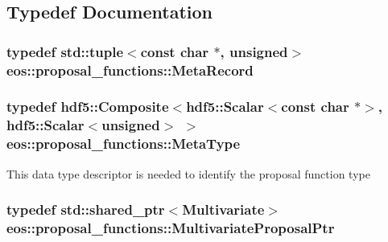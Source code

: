 \subsection{Typedef Documentation}
\hypertarget{namespaceeos_1_1proposal__functions_a7b9711fcd1f76e034c72073e2d5d7f15}{
\subsubsection[{MetaRecord}]{\setlength{\rightskip}{0pt plus 5cm}typedef std::tuple$<$const char $\ast$, unsigned$>$ {\bf eos::proposal\_\-functions::MetaRecord}}}
\label{namespaceeos_1_1proposal__functions_a7b9711fcd1f76e034c72073e2d5d7f15}
\hypertarget{namespaceeos_1_1proposal__functions_ad45af5ebbbdc545b033b153cafe7e360}{
\subsubsection[{MetaType}]{\setlength{\rightskip}{0pt plus 5cm}typedef {\bf hdf5::Composite}$<${\bf hdf5::Scalar}$<$const char $\ast$$>$, {\bf hdf5::Scalar}$<$unsigned$>$ $>$ {\bf eos::proposal\_\-functions::MetaType}}}
\label{namespaceeos_1_1proposal__functions_ad45af5ebbbdc545b033b153cafe7e360}
This data type descriptor is needed to identify the proposal function type \hypertarget{namespaceeos_1_1proposal__functions_a6cffa18d523cd6955629beabbe07c17c}{
\subsubsection[{MultivariateProposalPtr}]{\setlength{\rightskip}{0pt plus 5cm}typedef std::shared\_\-ptr$<${\bf Multivariate}$>$ {\bf eos::proposal\_\-functions::MultivariateProposalPtr}}}
\label{namespaceeos_1_1proposal__functions_a6cffa18d523cd6955629beabbe07c17c}


